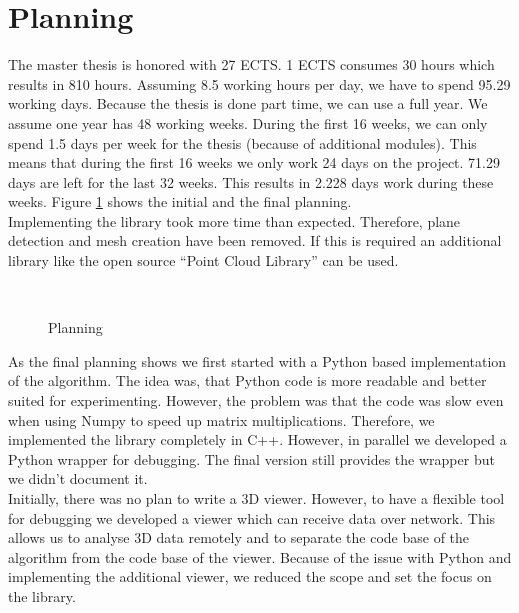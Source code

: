 \documentclass[11pt,a4paper,titlepage,oneside]{report}
\begin{document}
\section{Planning}
The master thesis is honored with 27 ECTS. 1 ECTS consumes 30 hours which results in 810 hours. Assuming 8.5 working hours per day, we have to spend 95.29 working days. Because the thesis is done part time, we can use a full year. We assume one year has 48 working weeks. During the first 16 weeks, we can only spend 1.5 days per week for the thesis (because of additional modules). This means that during the first 16 weeks we only work 24 days on the project. 71.29 days are left for the last 32 weeks. This results in 2.228 days work during these weeks. Figure \ref{fig:gantt} shows the initial and the final planning.\\
Implementing the library took more time than expected. Therefore, plane detection and mesh creation have been removed. If this is required an additional library like the open source ``Point Cloud Library'' \cite{pcl} can be used.

\begin{figure}[H]
  \\
  \caption{Planning}\label{fig:gantt}
\end{figure}

As the final planning shows we first started with a Python based implementation of the algorithm. The idea was, that Python code is more readable and better suited for experimenting. However, the problem was that the code was slow even when using Numpy to speed up matrix multiplications. Therefore, we implemented the library completely in C++. However, in parallel we developed a Python wrapper for debugging. The final version still provides the wrapper but we didn't document it.\\
Initially, there was no plan to write a 3D viewer. However, to have a flexible tool for debugging we developed a viewer which can receive data over network. This allows us to analyse 3D data remotely and to separate the code base of the algorithm from the code base of the viewer. Because of the issue with Python and implementing the additional viewer, we reduced the scope and set the focus on the library.
\end{document}
